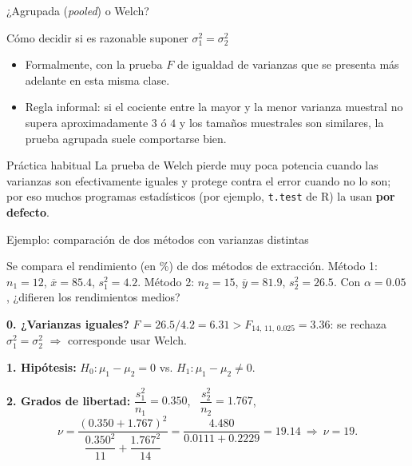 \documentclass[aspectratio=169,11pt]{beamer}
\begin{document}
\begin{frame}{¿Agrupada (\emph{pooled}) o Welch?}
\begin{block}{Cómo decidir si es razonable suponer $\sigma_1^2=\sigma_2^2$}
\begin{itemize}
\item Formalmente, con la prueba $F$ de igualdad de varianzas que se presenta más adelante en esta misma clase.
\item Regla informal: si el cociente entre la mayor y la menor varianza muestral no supera aproximadamente $3$ ó $4$ y los tamaños muestrales son similares, la prueba agrupada suele comportarse bien.
\end{itemize}
\end{block}

\begin{alertblock}{Práctica habitual}
La prueba de Welch pierde muy poca potencia cuando las varianzas son efectivamente iguales y protege contra el error cuando no lo son; por eso muchos programas estadísticos (por ejemplo, \texttt{t.test} de R) la usan \textbf{por defecto}.
\end{alertblock}
\end{frame}

\begin{frame}{Ejemplo: comparación de dos métodos con varianzas distintas}
\begin{example}
Se compara el rendimiento (en \%) de dos métodos de extracción. Método 1: $n_1=12$, $\overline{x}=85.4$, $s_1^2=4.2$. Método 2: $n_2=15$, $\overline{y}=81.9$, $s_2^2=26.5$. Con $\alpha=0.05$, ¿difieren los rendimientos medios?

\textbf{0. ¿Varianzas iguales?} $F=26.5/4.2=6.31>F_{14,\,11,\,0.025}=3.36$: se rechaza $\sigma_1^2=\sigma_2^2$ $\Rightarrow$ corresponde usar Welch.

\textbf{1. Hipótesis:} $H_0:\mu_1-\mu_2=0$ vs. $H_1:\mu_1-\mu_2\neq0$.

\textbf{2. Grados de libertad:} $\dfrac{s_1^2}{n_1}=0.350$, \ $\dfrac{s_2^2}{n_2}=1.767$,
\[
\nu=\frac{(0.350+1.767)^2}{\dfrac{0.350^2}{11}+\dfrac{1.767^2}{14}}=\frac{4.480}{0.0111+0.2229}=19.14 \ \Rightarrow\ \nu=19.
\]
\end{example}
\end{frame}
\end{document}
